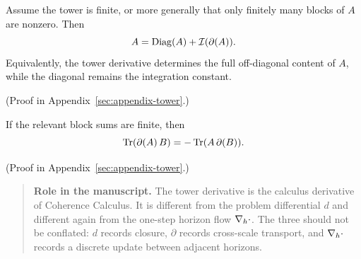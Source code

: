 \begin{theorem}
\label{thm:ftc-tower}
Assume the tower is finite, or more generally that only finitely many blocks of
$A$ are nonzero. Then
\[
A = \mathrm{Diag}(A) + \mathcal{I}(\partial(A)).
\]
Equivalently, the tower derivative determines the full off-diagonal content of
$A$, while the diagonal remains the integration constant.
\end{theorem}

(Proof in Appendix~\ref{sec:appendix-tower}.)

\begin{proposition}
\label{prop:tower-ibp}
If the relevant block sums are finite, then
\[
\mathrm{Tr}(\partial(A)\, B) = -\, \mathrm{Tr}(A\, \partial(B)).
\]
\end{proposition}

(Proof in Appendix~\ref{sec:appendix-tower}.)

\begin{quote}\small
\textbf{Role in the manuscript.}
The tower derivative is the calculus derivative of Coherence Calculus. It is
different from the problem differential $d$ and different again from the
one-step horizon flow $\nabla_{h} \cdot$. The three should not be conflated:
$d$ records closure, $\partial$ records cross-scale transport, and
$\nabla_{h} \cdot$ records a discrete update between adjacent horizons.
\end{quote}
